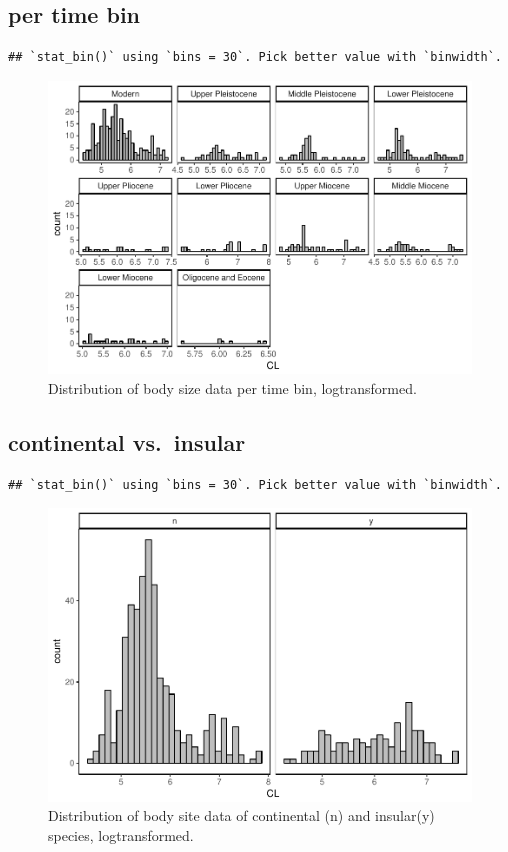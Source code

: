 \documentclass[]{article}
\begin{document}
\subsection{per time bin}\label{per-time-bin}

\begin{verbatim}
## `stat_bin()` using `bins = 30`. Pick better value with `binwidth`.
\end{verbatim}

\begin{figure}[htbp]
\centering
\includegraphics{MA_JJ_files/figure-latex/Histograms of body size data, per time bin-1.pdf}
\caption{Distribution of body size data per time bin, logtransformed.}
\end{figure}

\subsection{continental vs.~insular}\label{continental-vs.insular}

\begin{verbatim}
## `stat_bin()` using `bins = 30`. Pick better value with `binwidth`.
\end{verbatim}

\begin{figure}[htbp]
\centering
\includegraphics{MA_JJ_files/figure-latex/Histograms of body size data, continental vs. insular-1.pdf}
\caption{Distribution of body site data of continental (n) and
insular(y) species, logtransformed.}
\end{figure}
\end{document}
